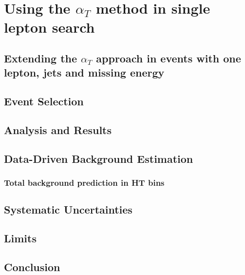 \chapter{Using the $\alpha_{T}$ method in single lepton search}
\section{Extending the $\alpha_{T}$ approach in events with one lepton, jets and missing energy}
\section{Event Selection}
\section{Analysis and Results}
\section{Data-Driven Background Estimation}
\subsection{Total background prediction in HT bins}
\section{Systematic Uncertainties}
\section{Limits}
\section{Conclusion}


